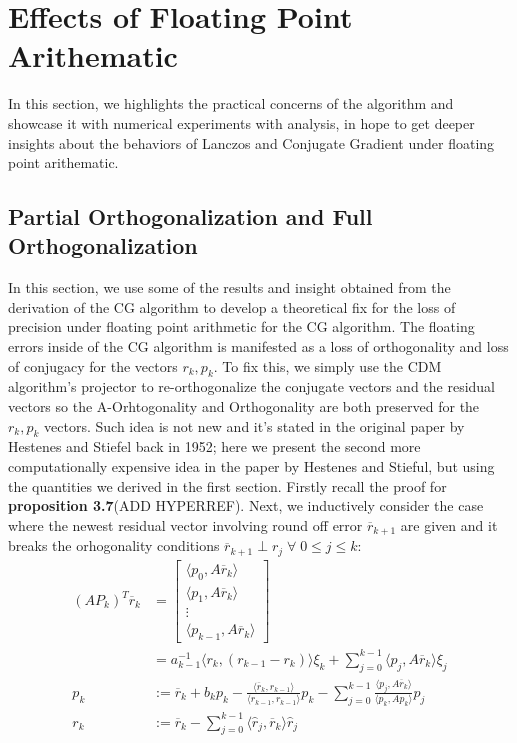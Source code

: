 \documentclass[]{article}
\theoremstyle{definition}
\begin{document}
\section{Effects of Floating Point Arithematic}
    In this section, we highlights the practical concerns of the algorithm and showcase it with numerical experiments with analysis, in hope to get deeper insights about the behaviors of Lanczos and Conjugate Gradient under floating point arithematic. 
    \subsection{Partial Orthogonalization and Full Orthogonalization}
        In this section, we use some of the results and insight obtained from the derivation of the CG algorithm to develop a theoretical fix for the loss of precision under floating point arithmetic for the CG algorithm. The floating errors inside of the CG algorithm is manifested as a loss of orthogonality and loss of conjugacy for the vectors $r_k, p_k$. To fix this, we simply use the CDM algorithm's projector to re-orthogonalize the conjugate vectors and the residual vectors so the A-Orhtogonality and Orthogonality are both preserved for the $r_k, p_k$ vectors. Such idea is not new and it's stated in the original paper by Hestenes and Stiefel back in 1952; here we present the second more computationally expensive idea in the paper by Hestenes and Stieful, but using the quantities we derived in the first section. Firstly recall the proof for \textbf{proposition 3.7}(ADD HYPERREF). Next, we inductively consider the case where the newest residual vector involving round off error $\overline{r}_{k + 1}$ are given and it breaks the orhogonality conditions $\overline{r}_{k + 1} \perp r_{j} \; \forall \; 0 \le j \le k$: 
        \begin{align}
            (AP_k)^T\overline{r}_k &= 
            \begin{bmatrix}
                \langle p_0, A\overline{r}_k\rangle
                \\
                \langle p_1, A\overline{r}_k\rangle
                \\
                \vdots
                \\
                \langle p_{k - 1}, A\overline{r}_k\rangle
            \end{bmatrix}
            \\
            & = 
            a_{k - 1}^{-1}\langle r_k, (r_{k - 1} - r_k)\rangle\xi_k + \sum_{j = 0}^{k - 1}\langle p_j, A\overline{r}_k\rangle \xi_j
            \\
            p_k &:= \overline{r}_k + b_kp_k - 
                \frac{\langle \overline{r}_k, r_{k -1}\rangle}{\langle r_{k - 1}, r_{k - 1}\rangle}p_k
            - \sum_{j = 0}^{k - 1}\frac{\langle p_j, A\overline{r}_k\rangle}{\langle p_k, Ap_k\rangle}p_j
            \\
            r_k &:= \overline{r}_k - \sum_{j = 0}^{k - 1} \langle \hat{r}_j,\overline{r}_k\rangle \hat{r}_j
        \end{align}
\end{document}
